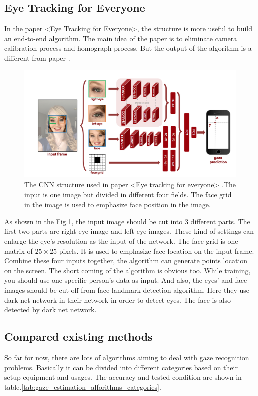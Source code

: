 \documentclass[senior]{IPSstyle}
\begin{document}
\subsection{Eye Tracking for Everyone}
In the paper <Eye Tracking for Everyone>\cite{krafka2016eye}, the structure is more useful to build an end-to-end algorithm.
The main idea of the paper is to eliminate camera calibration process and homograph process.
But the output of the algorithm is a different from paper \cite{zhang2015appearance}.
\begin{figure}[b]
    \centering
    \includegraphics[width=15cm]{MasterThesis-master/images/eye_tracking_cnn.png}
    \caption{The CNN structure used in paper <Eye tracking for everyone> \cite{krafka2016eye}.The input is one image but divided in different four fields. The face grid in the image is used to emphasize face position in the image.}
    \label{fig:eye_tracking_CNN}
\end{figure}
As shown in the Fig.\ref{fig:eye_tracking_CNN}, the input image should be cut into 3 different parts.
The first two parts are right eye image and left eye images.
These kind of settings can enlarge the eye's resolution as the input of the network.
The face grid is one matrix of $25 \times 25$ pixels.
It is used to emphasize face location on the input frame.
Combine these four inputs together, the algorithm can generate points location on the screen.
The short coming of the algorithm is obvious too.
While training, you should use one specific person's data as input.
And also, the eyes' and face images should be cut off from face landmark detection algorithm.
Here they use dark net network \cite{hinton2015distilling} in their network in order to detect eyes.
The face is also detected by dark net network\cite{hinton2015distilling}.


\subsection{Compared existing methods}
So far for now, there are lots of algorithms aiming to deal with gaze recognition problems.
Basically it can be divided into different categories based on their setup equipment and usages.
The accuracy and tested condition are shown in table.\ref{tab:gaze_estimation_alforithms_categories}.
\end{document}

